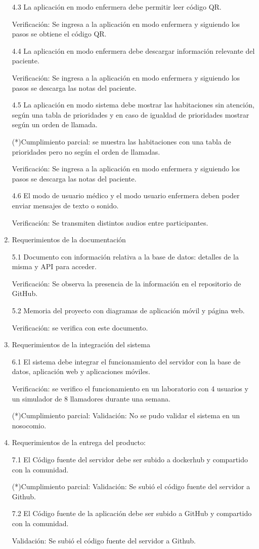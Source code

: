 \begin{enumerate}
4.3 La aplicación en modo enfermera debe permitir leer código QR.

Verificación: Se ingresa a la aplicación en modo enfermera y siguiendo los pasos se obtiene el código QR.

4.4 La aplicación en modo enfermera debe descargar información relevante del paciente.

Verificación: Se ingresa a la aplicación en modo enfermera y siguiendo los pasos se descarga las notas del paciente.

4.5 La aplicación en modo sistema debe mostrar las habitaciones sin atención, según una tabla de prioridades y en caso de igualdad de prioridades mostrar según un orden de llamada.

(*)Cumplimiento parcial: se muestra las habitaciones con una tabla de prioridades pero no según el orden de llamadas.

Verificación: Se ingresa a la aplicación en modo enfermera y siguiendo los pasos se descarga las notas del paciente.


4.6 El modo de usuario médico y el modo usuario enfermera deben poder enviar mensajes de texto o sonido.

Verificación: Se transmiten distintos audios entre participantes.

\item Requerimientos de la documentación

5.1 Documento con información relativa a la base de datos: detalles de la misma y API para acceder.

Verificación: Se observa la presencia de la información en el repositorio de GitHub.

5.2 Memoria del proyecto con diagramas de aplicación móvil y página web.

Verificación: se verifica con este documento.

\item Requerimientos de la integración del sistema

6.1 El sistema debe integrar el funcionamiento del servidor con la base de datos, aplicación web y aplicaciones móviles.

Verificación: se verifico el funcionamiento en un laboratorio con 4 usuarios y un simulador de 8 llamadores durante una semana.

(*)Cumplimiento parcial:
Validación: No se pudo validar el sistema en un nosocomio.

\item Requerimientos de la entrega del producto:

7.1 El Código fuente del servidor debe ser subido a dockerhub y compartido con la comunidad.

(*)Cumplimiento parcial:
Validación: Se subió el código fuente del servidor a Github.

7.2 El Código fuente de la aplicación debe ser subido a GitHub y compartido con la comunidad.

Validación: Se subió el código fuente del servidor a Github.

\end{enumerate}
